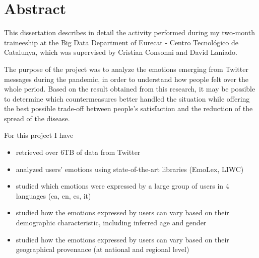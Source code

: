 
\chapter*{Abstract} %
\label{abstract}  


This dissertation describes in detail the activity performed during my two-month traineeship at the Big Data Department of Eurecat - Centro Tecnológico de Catalunya, which was supervised by Cristian Consonni and David Laniado.

The purpose of the project was to analyze the emotions emerging from Twitter messages during the pandemic, in order to understand how people felt over the whole period. Based on the result obtained from this research, it may be possible to determine which countermeasures better handled the situation while offering the best possible trade-off between people's satisfaction and the reduction of the spread of the disease.

For this project I have
    
    \begin{itemize}
    	\item retrieved over 6TB of data from Twitter
    	\item analyzed users' emotions using state-of-the-art libraries (EmoLex, LIWC)
    	\item studied which emotions were expressed by a large group of users in 4 languages (ca, en, es, it)
    	\item studied how the emotions expressed by users can vary based on their demographic characteristic, including inferred age and gender
    	\item studied how the emotions expressed by users can vary based on their geographical provenance (at national and regional level)
    \end{itemize}

